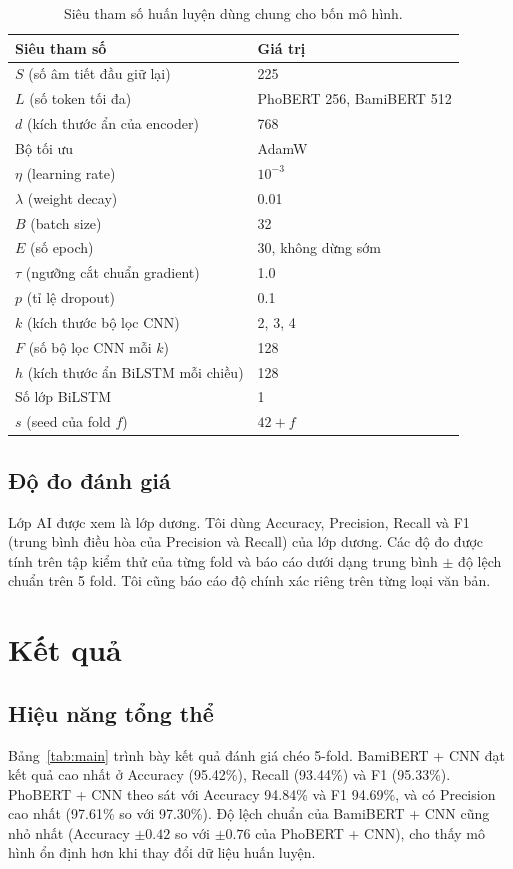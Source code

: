\documentclass[conference,a4paper]{IEEEtran}
\begin{document}
\begin{table}[t]
  \centering
  \caption{Siêu tham số huấn luyện dùng chung cho bốn mô hình.}
  \label{tab:hparams}
  \setlength{\tabcolsep}{4pt}
  \begin{tabular}{ll}
    \toprule
    Siêu tham số & Giá trị \\
    \midrule
    $S$ (số âm tiết đầu giữ lại) & 225 \\
    $L$ (số token tối đa) & PhoBERT 256, BamiBERT 512 \\
    $d$ (kích thước ẩn của encoder) & 768 \\
    Bộ tối ưu & AdamW \cite{adamw} \\
    $\eta$ (learning rate) & $10^{-3}$ \\
    $\lambda$ (weight decay) & 0.01 \\
    $B$ (batch size) & 32 \\
    $E$ (số epoch) & 30, không dừng sớm \\
    $\tau$ (ngưỡng cắt chuẩn gradient) & 1.0 \\
    $p$ (tỉ lệ dropout) & 0.1 \\
    $k$ (kích thước bộ lọc CNN) & 2, 3, 4 \\
    $F$ (số bộ lọc CNN mỗi $k$) & 128 \\
    $h$ (kích thước ẩn BiLSTM mỗi chiều) & 128 \\
    Số lớp BiLSTM & 1 \\
    $s$ (seed của fold $f$) & $42 + f$ \\
    \bottomrule
  \end{tabular}
\end{table}

\subsection{Độ đo đánh giá}
Lớp AI được xem là lớp dương. Tôi dùng Accuracy, Precision, Recall và F1 (trung bình điều hòa của Precision và Recall) của lớp dương. Các độ đo được tính trên tập kiểm thử của từng fold và báo cáo dưới dạng trung bình $\pm$ độ lệch chuẩn trên 5 fold. Tôi cũng báo cáo độ chính xác riêng trên từng loại văn bản.

\section{Kết quả}
\label{sec:results}

\subsection{Hiệu năng tổng thể}
Bảng~\ref{tab:main} trình bày kết quả đánh giá chéo 5-fold. BamiBERT + CNN đạt kết quả cao nhất ở Accuracy (95.42\%), Recall (93.44\%) và F1 (95.33\%). PhoBERT + CNN theo sát với Accuracy 94.84\% và F1 94.69\%, và có Precision cao nhất (97.61\% so với 97.30\%). Độ lệch chuẩn của BamiBERT + CNN cũng nhỏ nhất (Accuracy $\pm 0.42$ so với $\pm 0.76$ của PhoBERT + CNN), cho thấy mô hình ổn định hơn khi thay đổi dữ liệu huấn luyện.
\end{document}
